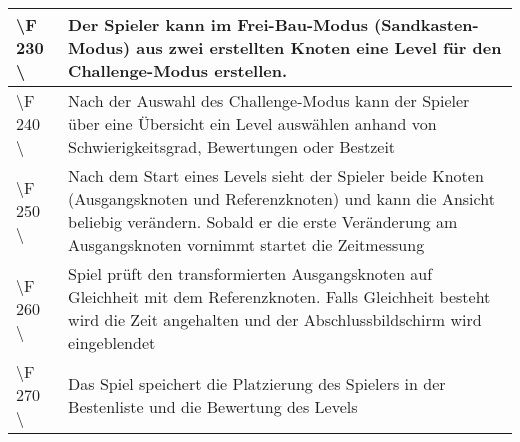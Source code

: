 \begin{tabular}{|p{}|p{}|}
\hline
\textbackslash F 230  \textbackslash  & Der Spieler kann im Frei-Bau-Modus (Sandkasten-Modus) aus zwei erstellten Knoten eine Level für den Challenge-Modus erstellen.\\
\hline
\textbackslash F 240  \textbackslash  & Nach der Auswahl des Challenge-Modus kann der Spieler über eine Übersicht ein Level auswählen anhand von Schwierigkeitsgrad, Bewertungen oder Bestzeit \\
\hline
\textbackslash F 250  \textbackslash  & Nach dem Start eines Levels sieht der Spieler beide Knoten (Ausgangsknoten und Referenzknoten) und kann die Ansicht beliebig verändern. Sobald er die erste Veränderung am Ausgangsknoten vornimmt startet die Zeitmessung\\
\hline
\textbackslash F 260  \textbackslash  & Spiel prüft den transformierten Ausgangsknoten auf Gleichheit mit dem Referenzknoten. Falls Gleichheit besteht wird die Zeit angehalten und der Abschlussbildschirm wird eingeblendet \\
\hline
\textbackslash F 270  \textbackslash  & Das Spiel speichert die Platzierung des Spielers in der Bestenliste und die Bewertung des Levels\\
\hline
\end{tabular} 
	
